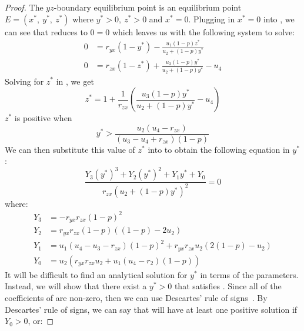 \begin{proof}
    The $yz$-boundary equilibrium point is an equilibrium point $E=\left(x^*,\ y^*,\ z^*\right)$ where $y^*>0,\ z^*>0$ and $x^*=0$. Plugging in $x^*=0$ into , we can see that  reduces to $0=0$ which leaves us with the following system to solve:
    \begin{subequations}\label{system:yz-boundary}
        \begin{align}
            0 &= r_{yx}\left(1-y^*\right)-\frac{u_1\left(1-p\right)z^*}{u_2+\left(1-p\right)y^*} \label{eq:yz-boundary-y}\\
            0 &= r_{zx}\left(1-z^*\right)+\frac{u_3\left(1-p\right)y^*}{u_2+\left(1-p\right)y^*}-u_4 \label{eq:yz-boundary-z}
        \end{align}
    \end{subequations}
    Solving for $z^*$ in , we get
    \begin{equation*}
        z^*=1+\frac{1}{r_{zx}}\left(\frac{u_3\left(1-p\right)y^*}{u_2+\left(1-p\right)y^*}-u_4\right)
    \end{equation*}
    $z^*$ is positive when
    \begin{equation*}
        y^* > \frac{u_2\left(u_4-r_{zx}\right)}{\left(u_3-u_4+r_{zx}\right)\left(1-p\right)}
    \end{equation*}
    We can then substitute this value of $z^*$ into  to obtain the following equation in $y^*$:
    \begin{equation}\label{eq:yz-Y-vars}
        \frac{Y_3\left(y^*\right)^3+Y_2\left(y^*\right)^2+Y_1y^*+Y_0}{r_{zx}\left(u_2+\left(1-p\right)y^*\right)^2}=0
    \end{equation}
    where:
    \begin{align*}
        Y_3 &= -r_{yx}r_{zx}\left(1-p\right)^2\\
        Y_2 &= r_{yx}r_{zx}\left(1-p\right)\left(\left(1-p\right)-2u_2\right)\\
        Y_1 &= u_1\left(u_4-u_3-r_{zx}\right)\left(1-p\right)^2+r_{yx}r_{zx}u_2\left(2\left(1-p\right)-u_2\right)\\
        Y_0 &= u_2\left(r_{yx}r_{zx}u_2+u_1\left(u_4-r_2\right)\left(1-p\right)\right)
    \end{align*}
    It will be difficult to find an analytical solution for $y^*$ in terms of the parameters. Instead, we will show that there exist a $y^*>0$ that satisfies . Since all of the coefficients of  are non-zero, then we can use Descartes' rule of signs~\cite{WANG2004525526}. By Descartes' rule of signs, we can say that  will have at least one positive solution if $Y_0>0$, or:

\end{proof}
